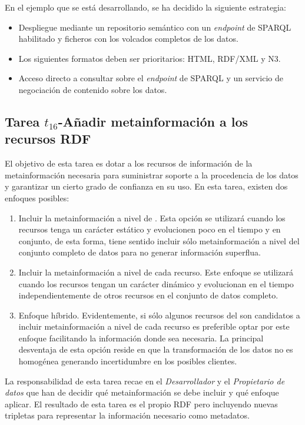 En el ejemplo que se está desarrollando, se ha decidido la siguiente estrategia:

\begin{itemize}
 \item Despliegue mediante un repositorio semántico con un \textit{endpoint} de \gls{SPARQL} habilitado y ficheros con los volcados completos de los datos.
 \item Los siguientes formatos deben ser prioritarios: \gls{HTML}, \gls{RDF/XML} y \gls{N3}.
 \item Acceso directo a consultar sobre el \textit{endpoint} de \gls{SPARQL} y un servicio de negociación de contenido sobre los datos.
\end{itemize}

\subsection{Tarea $t_{16}$-Añadir metainformación a los recursos RDF}\label{t16-metodos}
El objetivo de esta tarea es dotar a los recursos de información de la metainformación 
necesaria para suministrar soporte a la procedencia de los datos y garantizar 
un cierto grado de confianza en su uso. En esta tarea, existen dos enfoques 
posibles:
\begin{enumerate}
 \item Incluir la metainformación a nivel de \dataset. Esta opción se utilizará cuando 
los recursos tenga un carácter estático y evolucionen poco en el tiempo y en conjunto, de esta forma, 
tiene sentido incluir sólo metainformación a nivel del conjunto completo de datos para no generar 
información superflua.
 \item Incluir la metainformación a nivel de cada recurso. Este enfoque se utilizará cuando 
los recursos tengan un carácter dinámico y evolucionan en el tiempo independientemente de otros 
recursos en el conjunto de datos completo. 
 \item Enfoque híbrido. Evidentemente, si sólo algunos recursos del \dataset son candidatos 
a incluir metainformación a nivel de cada recurso es preferible optar por este enfoque facilitando 
la información donde sea necesaria. La principal desventaja de esta opción reside en que la transformación 
de los datos no es homogénea generando incertidumbre en los posibles clientes. 
\end{enumerate}

La responsabilidad de esta tarea recae en el \textit{Desarrollador} y el \textit{Propietario de datos} que han de decidir 
qué metainformación se debe incluir y qué enfoque aplicar. El resultado de esta tarea es el propio 
\dataset \gls{RDF} pero incluyendo nuevas tripletas para representar la información necesario como 
metadatos.

